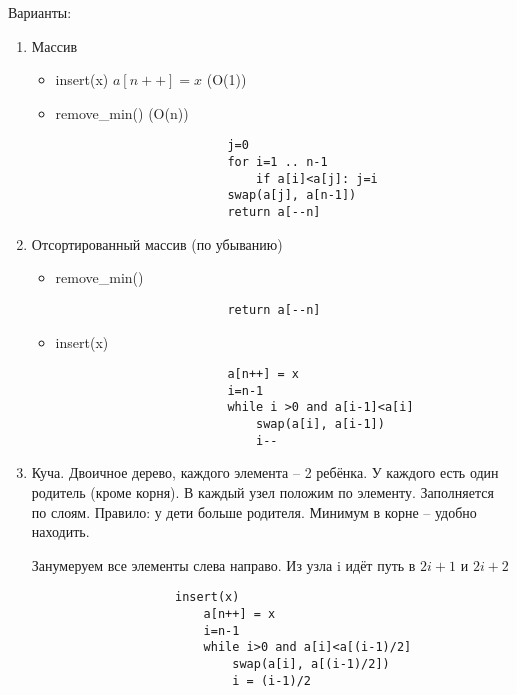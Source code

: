 \documentclass{book}
\theoremstyle{definition}
\begin{document}
    Варианты:
    \begin{enumerate}
        \item Массив
            \begin{itemize}
                \item  insert(x) $a[n++] = x$ (O(1))
                    
                \item remove\_min() (O(n))
                    \begin{verbatim}
                        j=0
                        for i=1 .. n-1
                            if a[i]<a[j]: j=i
                        swap(a[j], a[n-1])
                        return a[--n]
                    \end{verbatim}
            \end{itemize}
        \item Отсортированный массив (по убыванию)
            \begin{itemize}
                \item remove\_min()
                    \begin{verbatim}
                        return a[--n]
                    \end{verbatim}
                \item insert(x)
                    \begin{verbatim}
                        a[n++] = x
                        i=n-1
                        while i >0 and a[i-1]<a[i]
                            swap(a[i], a[i-1])
                            i--
                    \end{verbatim}
            \end{itemize}
            \item Куча. Двоичное дерево, каждого элемента -- 2 ребёнка. У каждого есть один родитель (кроме корня). В каждый узел положим по элементу. Заполняется по слоям. Правило: у дети больше родителя. Минимум в корне -- удобно находить.

                Занумеруем все элементы слева направо. Из узла i идёт путь в $2i+1$ и $2i+2$

                \begin{verbatim}
                    insert(x)
                        a[n++] = x
                        i=n-1
                        while i>0 and a[i]<a[(i-1)/2]
                            swap(a[i], a[(i-1)/2])
                            i = (i-1)/2     
                \end{verbatim}


\end{enumerate}
\end{document}
